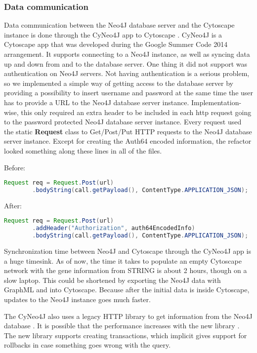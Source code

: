 \subsubsection{Data communication}
Data communication between the Neo4J database server and the Cytoscape instance
is done through the CyNeo4J app to Cytoscape \cite{cyneo4j}. CyNeo4J is a
Cytoscape app that was developed during the Google Summer Code 2014 arrangement.
It supports connecting to a Neo4J instance, as well as syncing data up and down
from and to the database server. One thing it did not support was authentication
on Neo4J servers. Not having authentication is a serious problem, so we
implemented a simple way of getting access to the database server by providing a
possibility to insert username and password at the same time the user has to
provide a URL to the Neo4J database server instance. Implementation-wise, this
only required an extra header to be included in each http request going to the
password protected Neo4J database server instance. Every request used the static
\textbf{Request} class to Get/Post/Put HTTP requests to the Neo4J database
server instance. Except for creating the Auth64 encoded information, the
refactor looked something along these lines in all of the files.

Before:
\begin{lstlisting}[frame=single,language=Java]
Request req = Request.Post(url)
        .bodyString(call.getPayload(), ContentType.APPLICATION_JSON);
\end{lstlisting}

After:
\begin{lstlisting}[frame=single,language=Java]
Request req = Request.Post(url)
        .addHeader("Authorization", auth64EncodedInfo)
        .bodyString(call.getPayload(), ContentType.APPLICATION_JSON);
\end{lstlisting}

Synchronization time between Neo4J and Cytoscape through the CyNeo4J app is a
huge timesink. As of now, the time it takes to populate an empty Cytoscape
network with the gene information from STRING is about 2 hours, though on a slow
laptop. This could be shortened by exporting the Neo4J data with GraphML and
into Cytoscape. Because after the initial data is inside Cytoscape, updates to
the Neo4J instance goes much faster.

The CyNeo4J also uses a legacy HTTP library to get information from the Neo4J
database \cite{legacy-neo4j}. It is possible that the performance increases with
the new library \cite{transactional-neo4j}. The new library supports creating
transactions, which implicit gives support for rollbacks in case something goes
wrong with the query.

